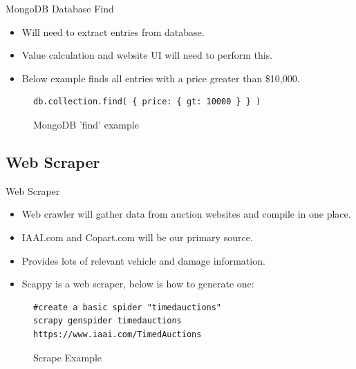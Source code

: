 \documentclass{beamer}
\begin{document}
\begin{frame}[fragile=singleslide]{MongoDB Database Find}
\begin{itemize}
    \setlength\itemsep{2em}
    \item Will need to extract entries from database. 
    \item Value calculation and website UI will need to perform this. 
    \item Below example finds all entries with a price greater than \$10,000.
    
\end{itemize}
\begin{figure}[ht]
\centering
\begin{itemize}

\begin{verbatim}
db.collection.find( { price: { gt: 10000 } } )
\end{verbatim}

\end{itemize}
\caption{MongoDB 'find' example}
\end{figure}

\end{frame}

\subsection{Web Scraper}
\begin{frame}[fragile=singleslide]{Web Scraper}
\begin{itemize}
    \setlength\itemsep{2em}
    \item Web crawler will gather data from auction websites and compile in one place. 
    \item IAAI.com and Copart.com will be our primary source.
    \item Provides lots of relevant vehicle and damage information. 
    \item Scappy is a web scraper, below is how to generate one: 
\end{itemize}

\begin{figure}[ht]
\centering

\begin{verbatim}
#create a basic spider "timedauctions"
scrapy genspider timedauctions
https://www.iaai.com/TimedAuctions
\end{verbatim}

\caption{Scrape Example}
\end{figure}

\end{frame}
\end{document}
